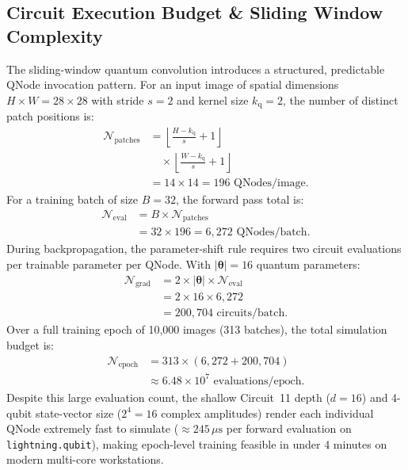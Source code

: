 \documentclass[pdflatex,sn-mathphys-num]{sn-jnl}%
\theoremstyle{thmstyleone}%
\theoremstyle{thmstyletwo}%
\theoremstyle{thmstylethree}%
\begin{document}
\subsection{Circuit Execution Budget \& Sliding Window Complexity}
The sliding-window quantum convolution introduces a structured, predictable QNode invocation pattern. For an input image of spatial dimensions $H \times W = 28 \times 28$ with stride $s = 2$ and kernel size $k_{\mathrm{q}} = 2$, the number of distinct patch positions is:
\begin{align}
\mathcal{N}_{\mathrm{patches}} &= \left\lfloor \frac{H - k_{\mathrm{q}}}{s} + 1 \right\rfloor \nonumber \\
&\quad \times \left\lfloor \frac{W - k_{\mathrm{q}}}{s} + 1 \right\rfloor \nonumber \\
&= 14 \times 14 = 196 \text{ QNodes/image}.
\label{eq:patch_count}
\end{align}
For a training batch of size $B = 32$, the forward pass total is:
\begin{align}
\mathcal{N}_{\mathrm{eval}} &= B \times \mathcal{N}_{\mathrm{patches}} \nonumber \\
&= 32 \times 196 = 6,272 \text{ QNodes/batch}.
\label{eq:qnode_budget}
\end{align}
During backpropagation, the parameter-shift rule requires two circuit evaluations per trainable parameter per QNode. With $|\boldsymbol{\theta}| = 16$ quantum parameters:
\begin{align}
\mathcal{N}_{\mathrm{grad}} &= 2 \times |\boldsymbol{\theta}| \times \mathcal{N}_{\mathrm{eval}} \nonumber \\
&= 2 \times 16 \times 6{,}272 \nonumber \\
&= 200{,}704 \text{ circuits/batch}.
\label{eq:grad_eval_budget}
\end{align}
Over a full training epoch of 10,000 images (313 batches), the total simulation budget is:
\begin{align}
\mathcal{N}_{\mathrm{epoch}} &= 313 \times (6{,}272 + 200{,}704) \nonumber \\
&\approx 6.48 \times 10^7 \text{ evaluations/epoch}.
\end{align}
Despite this large evaluation count, the shallow Circuit~11 depth ($d = 16$) and 4-qubit state-vector size ($2^4 = 16$ complex amplitudes) render each individual QNode extremely fast to simulate ($\approx 245\,\mu\mathrm{s}$ per forward evaluation on \texttt{lightning.qubit}), making epoch-level training feasible in under 4 minutes on modern multi-core workstations.
\end{document}
